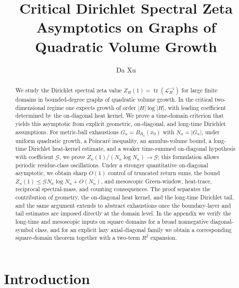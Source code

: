 \documentclass[reqno]{amsart}
\numberwithin{equation}{section}
\theoremstyle{definition}
\theoremstyle{remark}
\newcommand{\cG}{\mathcal{G}}
\DeclareMathOperator{\tr}{tr}
\newcommand{\LL}{\mathcal{L}}
\begin{document}
\title[Critical Dirichlet Spectral Zeta Asymptotics]{Critical Dirichlet Spectral Zeta Asymptotics on Graphs of Quadratic Volume Growth}
\author[D. Xu]{Da Xu}
\address{China Mobile Research Institute, Beijing, P.R.~China}
\date{}

\begin{abstract}\sloppy
We study the Dirichlet spectral zeta value $Z_H(1)=\tr(\LL_H^{-1})$ for large finite domains in bounded-degree graphs of quadratic volume growth. In the critical two-dimensional regime one expects growth of order $|H|\log|H|$, with leading coefficient determined by the on-diagonal heat kernel. We prove a time-domain criterion that yields this asymptotic from explicit geometric, on-diagonal, and long-time Dirichlet assumptions. For metric-ball exhaustions $G_n=B_{R_n}(x_0)$ with $N_n=|G_n|$, under uniform quadratic growth, a Poincar\'e inequality, an annulus-volume bound, a long-time Dirichlet heat-kernel estimate, and a weaker time-summed on-diagonal hypothesis with coefficient $\cG$, we prove $Z_n(1)/(N_n\log N_n)\to \cG$; this formulation allows periodic residue-class oscillations. Under a stronger quantitative on-diagonal asymptotic, we obtain sharp $O(1)$ control of truncated return sums, the bound $Z_n(1)\le \cG N_n\log N_n+O(N_n)$, and mesoscopic Green-window, heat-trace, reciprocal spectral-mass, and counting consequences. The proof separates the contribution of geometry, the on-diagonal heat kernel, and the long-time Dirichlet tail, and the same argument extends to abstract exhaustions once the boundary-layer and tail estimates are imposed directly at the domain level. In the appendix we verify the long-time and mesoscopic inputs on square domains for a broad nonnegative diagonal-symbol class, and for an explicit lazy axial-diagonal family we obtain a corresponding square-domain theorem together with a two-term $R^2$ expansion.
\end{abstract}

\maketitle
\section{Introduction}
\end{document}
